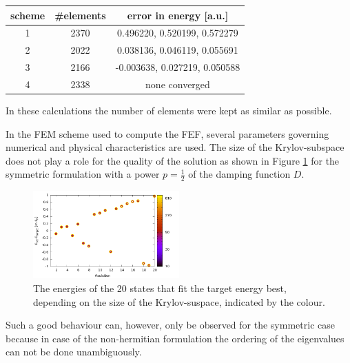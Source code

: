 \begin{tabular}{|c|c|c|}
\hline
scheme & \#elements & error in energy [a.u.]\\
\hline
1      & 2370      & 0.496220, 0.520199, 0.572279 \\
2      & 2022      & 0.038136, 0.046119, 0.055691 \\
3      & 2166      &-0.003638, 0.027219, 0.050588 \\
4      & 2338      & none converged \\
\hline
\end{tabular}
In these calculations the number of elements were kept as similar as possible.

In the FEM scheme used to compute the FEF, several parameters governing numerical and physical characteristics are used.
The size of the Krylov-subspace does not play a role for the quality of the solution as shown in Figure \ref{fig:E_nev} for the symmetric formulation with a power $p=\frac 12$ of the damping function $D$.
\begin{figure}
\includegraphics[width=0.5\textwidth]{Figures/Root_E_nev.pdf}
\caption{The energies of the 20 states that fit the target energy best, depending on the
size of the Krylov-suspace, indicated by the colour.}
\label{fig:E_nev}
\end{figure}
Such a good behaviour can, however, only be observed for the symmetric case because in case of the non-hermitian formulation the ordering of the eigenvalues can not be done unambiguously.

